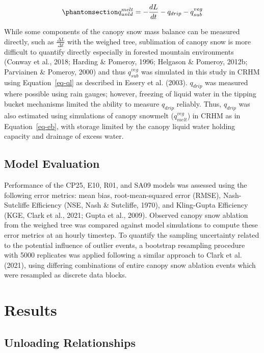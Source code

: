 \documentclass[
  letterpaper,
]{tex/uofsthesis-cs}
\begin{document}
\begin{equation}\phantomsection\label{eq-unld-melt-mass-bal}{
q_{unld}^{melt} = -\frac{dL}{dt} - q_{drip} - q_{sub}^{veg}
}\end{equation}

While some components of the canopy snow mass balance can be measured
directly, such as \(\frac{\Delta L}{\Delta t}\) with the weighed tree,
sublimation of canopy snow is more difficult to quantify directly
especially in forested mountain environments (Conway et al., 2018;
Harding \& Pomeroy, 1996; Helgason \& Pomeroy, 2012b; Parviainen \&
Pomeroy, 2000) and thus \(q_{sub}^{veg}\) was simulated in this study in
CRHM using Equation~\ref{eq-ql} as described in Essery et al. (2003).
\(q_{drip}\) was measured where possible using rain gauges; however,
freezing of liquid water in the tipping bucket mechanisms limited the
ability to measure \(q_{drip}\) reliably. Thus, \(q_{drip}\) was also
estimated using simulations of canopy snowmelt (\(q_{melt}^{veg}\)) in
CRHM as in Equation~\ref{eq-eb}, with storage limited by the canopy
liquid water holding capacity and drainage of excess water.

\subsection{Model Evaluation}\label{model-evaluation}

Performance of the CP25, E10, R01, and SA09 models was assessed using
the following error metrics: mean bias, root-mean-squared error (RMSE),
Nash-Sutcliffe Efficiency (NSE, Nash \& Sutcliffe, 1970), and
Kling-Gupta Efficiency (KGE, Clark et al., 2021; Gupta et al., 2009).
Observed canopy snow ablation from the weighed tree was compared against
model simulations to compute these error metrics at an hourly timestep.
To quantify the sampling uncertainty related to the potential influence
of outlier events, a bootstrap resampling procedure with 5000 replicates
was applied following a similar approach to Clark et al. (2021), using
differing combinations of entire canopy snow ablation events which were
resampled as discrete data blocks.

\section{Results}\label{results-1}

\subsection{Unloading Relationships}\label{sec-unld-rel}
\end{document}
